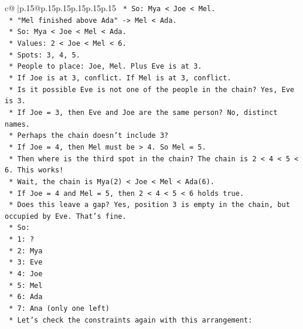 \documentclass{article}
\begin{document}
{\begin{supertabular}{c@{$\;$}|p{.15\linewidth}@{}p{.15\linewidth}p{.15\linewidth}p{.15\linewidth}p{.15\linewidth}p{.15\linewidth}}
{{{\texttt{                *   So: Mya < Joe < Mel.} \\
\texttt{                *   "Mel finished above Ada" {-}> Mel < Ada.} \\
\texttt{                *   So: Mya < Joe < Mel < Ada.} \\
\texttt{                *   Values: 2 < Joe < Mel < 6.} \\
\texttt{                *   Spots: 3, 4, 5.} \\
\texttt{                *   People to place: Joe, Mel. Plus Eve is at 3.} \\
\texttt{                *   If Joe is at 3, conflict. If Mel is at 3, conflict.} \\
\texttt{                *   Is it possible Eve is not one of the people in the chain? Yes, Eve is 3.} \\
\texttt{                *   If Joe = 3, then Eve and Joe are the same person? No, distinct names.} \\
\texttt{                *   Perhaps the chain doesn't include 3?} \\
\texttt{                *   If Joe = 4, then Mel must be > 4. So Mel = 5.} \\
\texttt{                *   Then where is the third spot in the chain? The chain is 2 < 4 < 5 < 6. This works!} \\
\texttt{                *   Wait, the chain is Mya(2) < Joe < Mel < Ada(6).} \\
\texttt{                *   If Joe = 4 and Mel = 5, then 2 < 4 < 5 < 6 holds true.} \\
\texttt{                *   Does this leave a gap? Yes, position 3 is empty in the chain, but occupied by Eve. That's fine.} \\
\texttt{                *   So:} \\
\texttt{                    *   1: ?} \\
\texttt{                    *   2: Mya} \\
\texttt{                    *   3: Eve} \\
\texttt{                    *   4: Joe} \\
\texttt{                    *   5: Mel} \\
\texttt{                    *   6: Ada} \\
\texttt{                    *   7: Ana (only one left)} \\
\texttt{                *   Let's check the constraints again with this arrangement:} \\
}}}
\end{supertabular}}
\end{document}
